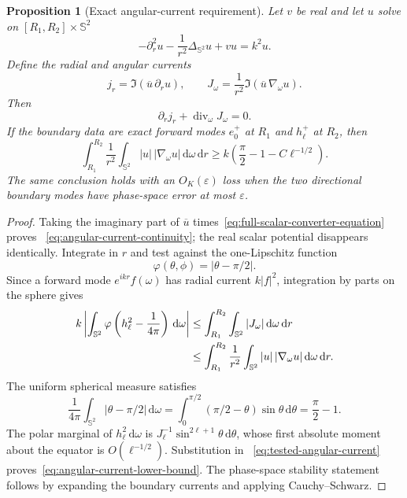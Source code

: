 \documentclass[11pt]{article}
\newcommand{\dd}{\,\mathrm d}
\newtheorem{proposition}[theorem]{Proposition}
\theoremstyle{definition}
\theoremstyle{remark}
\begin{document}
\begin{proposition}[Exact angular-current requirement]
\label{prop:angular-current-requirement}
Let $v$ be real and let $u$ solve on $[R_1,R_2]\times\mathbb S^2$
\begin{equation}
 -\partial_r^2u-\frac1{r^2}\Delta_{\mathbb S^2}u+vu=k^2u.
 \label{eq:full-scalar-converter-equation}
\end{equation}
Define the radial and angular currents
\begin{equation}
 j_r=\Im(\overline u\,\partial_ru),
 \qquad
 J_\omega=\frac1{r^2}\Im(\overline u\,\nabla_\omega u).
 \label{eq:radial-angular-currents}
\end{equation}
Then
\begin{equation}
 \partial_rj_r+\operatorname{div}_\omega J_\omega=0.
 \label{eq:angular-current-continuity}
\end{equation}
If the boundary data are exact forward modes $e_0^+$ at $R_1$ and
$h_\ell^+$ at $R_2$, then
\begin{equation}
 \int_{R_1}^{R_2}\frac1{r^2}
   \int_{\mathbb S^2}|u|\,|\nabla_\omega u|\dd\omega\dd r
 \geq k\left(\frac\pi2-1-C\ell^{-1/2}\right).
 \label{eq:angular-current-lower-bound}
\end{equation}
The same conclusion holds with an $O_K(\varepsilon)$ loss when the two
directional boundary modes have phase-space error at most $\varepsilon$.
\end{proposition}

\begin{proof}
Taking the imaginary part of
$\overline u$ times~\eqref{eq:full-scalar-converter-equation} proves
~\eqref{eq:angular-current-continuity}; the real scalar potential disappears
identically.  Integrate in $r$ and test against the one-Lipschitz function
\begin{equation}
 \varphi(\theta,\phi)=|\theta-\pi/2|.
\end{equation}
Since a forward mode $e^{ikr}f(\omega)$ has radial current $k|f|^2$, integration
by parts on the sphere gives
\begin{align}
 k\left|\int_{\mathbb S^2}\varphi
       \left(h_\ell^2-\frac1{4\pi}\right)\dd\omega\right|
 &\leq \int_{R_1}^{R_2}\int_{\mathbb S^2}|J_\omega|
       \dd\omega\dd r\notag\\
 &\leq \int_{R_1}^{R_2}\frac1{r^2}
       \int_{\mathbb S^2}|u|\,|\nabla_\omega u|
       \dd\omega\dd r.
 \label{eq:tested-angular-current}
\end{align}
The uniform spherical measure satisfies
\begin{equation}
 \frac1{4\pi}\int_{\mathbb S^2}|\theta-\pi/2|\dd\omega
 =\int_0^{\pi/2}(\pi/2-\theta)\sin\theta\dd\theta
 =\frac\pi2-1.
\end{equation}
The polar marginal of $h_\ell^2\dd\omega$ is
$J_\ell^{-1}\sin^{2\ell+1}\theta\dd\theta$, whose first absolute moment
about the equator is $O(\ell^{-1/2})$.  Substitution in
~\eqref{eq:tested-angular-current} proves~\eqref{eq:angular-current-lower-bound}.
The phase-space stability statement follows by expanding the boundary currents
and applying Cauchy--Schwarz.
\end{proof}
\end{document}
